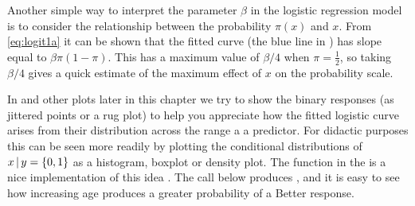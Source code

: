 \documentclass[11pt]{book}\usepackage[]{graphicx}\usepackage[]{color}
\begin{document}
Another simple way to interpret the parameter $\beta$ in the logistic regression
model is to consider the relationship between the probability $\pi(x)$ and $x$.
From \eqref{eq:logit1a} it can be shown that the fitted curve
(the blue line in ) has slope equal to
$\beta\pi (1-\pi)$.  This has a maximum value of $\beta / 4$ when $\pi = \frac12$,
so taking $\beta / 4$ gives a quick estimate of the maximum effect of $x$
on the probability scale.

In  and other plots later in this chapter we try to show
the binary responses (as jittered points or a rug plot) to help you appreciate how the fitted
logistic curve arises from their distribution across the range a a predictor.
For didactic purposes this can be seen more readily by plotting the conditional distributions
of $x \, | \, y=\{0,1\}$ as a histogram, boxplot or density plot.
The function  in the  is a nice implementation of
this idea \citep{Rot:2005}.  The call below produces ,
and it is easy to see how increasing age produces a greater probability of a Better
response.
\end{document}
